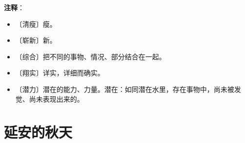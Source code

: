 \documentclass[12pt,UTF-8,openany]{ctexbook}
\begin{document}
\newpage

\textbf{注释}：

\vspace{-1em}

\begin{itemize}
    \setlength\itemsep{-0.2em}
    \item 〔清瘦〕瘦。
    \item 〔崭新〕新。
    \item 〔综合〕把不同的事物、情况、部分结合在一起。
    \item 〔翔实〕详实，详细而确实。
    \item 〔潜力〕潜在的能力、力量。潜在：如同潜在水里，存在事物中，尚未被发觉、尚未表现出来的。
\end{itemize}

\chapter{延安的秋天}
\end{document}
